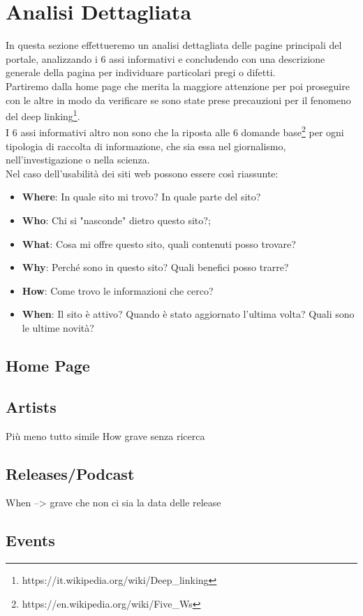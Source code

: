 \documentclass[10pt,a4paper]{article}
\begin{document}
\section{Analisi Dettagliata}
In questa sezione effettueremo un analisi dettagliata delle pagine principali del portale, analizzando i 6 assi informativi e concludendo con una descrizione generale della pagina per individuare particolari pregi o difetti. \\
Partiremo dalla home page che merita la maggiore attenzione per poi proseguire con le altre in modo da verificare se sono state prese precauzioni per il fenomeno del deep linking\footnote{https://it.wikipedia.org/wiki/Deep\_linking}. \\
I 6 assi informativi altro non sono che la riposta alle 6 domande base\footnote{https://en.wikipedia.org/wiki/Five\_Ws} per ogni tipologia di raccolta di informazione, che sia essa nel giornalismo, nell'investigazione o nella scienza. \\
Nel caso dell'usabilità dei siti web possono essere così riassunte:
\begin{itemize}
	\item \textbf{Where}: In quale sito mi trovo? In quale parte del sito?
	\item \textbf{Who}: Chi si "nasconde" dietro questo sito?;
	\item \textbf{What}: Cosa mi offre questo sito, quali contenuti posso trovare?
	\item \textbf{Why}: Perché sono in questo sito? Quali benefici posso trarre?
	\item \textbf{How}: Come trovo le informazioni che cerco?
	\item \textbf{When}: Il sito è attivo? Quando è stato aggiornato l'ultima volta? Quali sono le ultime novità?
\end{itemize}
\subsection{Home Page}
\label{sec-home-page}

\subsection{Artists}
Più meno tutto simile
How grave senza ricerca
\subsection{Releases/Podcast}
When --> grave che non ci sia la data delle release
\subsection{Events}
\end{document}
